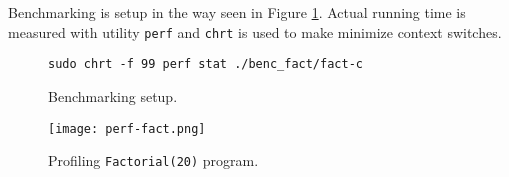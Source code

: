 Benchmarking is setup in the way seen in Figure \ref{bench-setup}. Actual running time is measured with utility \texttt{perf} and \texttt{chrt} is used to make minimize context switches.

\begin{figure}[h]
\begin{verbatim}
sudo chrt -f 99 perf stat ./benc_fact/fact-c 
\end{verbatim}
\caption{Benchmarking setup.}
\label{bench-setup}
\end{figure}


\begin{figure}[h]
\texttt{[image: perf-fact.png]}
\centering
\label{perf-fact}
\caption{Profiling \texttt{Factorial(20)} program.}
\end{figure}
